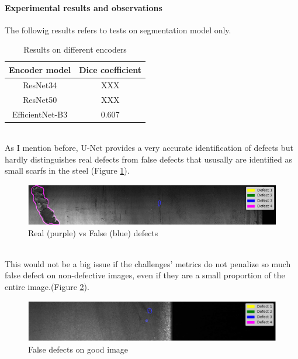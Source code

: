 \documentclass[10pt,twocolumn,letterpaper]{article}
\begin{document}
      \paragraph{Experimental results and observations}
         The followig results refers to tests on segmentation model only.
         \begin{table}[h]
            \centering
            \begin{tabular}{||c c||} 
            \hline
            Encoder model & Dice coefficient\\ [0.5ex] 
            \hline\hline
            ResNet34 & XXX \\ 
            \hline
            ResNet50 & XXX \\
            \hline
            EfficientNet-B3 & 0.607 \\
            \hline
         \end{tabular}
        \caption{Results on different encoders}
        \label{table:res_encoders}
      \end{table}
         \\As I mention before, U-Net provides a very accurate identification of defects but hardly distinguishes real defects from false defects that ususally are identified as small scarfs in the steel (Figure \ref{fig:result1}). 
         \begin{figure}[h]
            \centering
            \caption{Real (purple) vs False (blue) defects} \label{fig:result1}
            \includegraphics[scale=0.5]{Img_Result1.png}
         \end{figure}
         \\This would not be a big issue if the challenges' metrics do not penalize so much false defect on non-defective images, even if they are a small proportion of the entire image.(Figure \ref{fig:result2}).  
         \begin{figure}[h]
            \centering
            \caption{False defects on good image} \label{fig:result2}
            \includegraphics[scale=0.355]{Img_Result2.png}
         \end{figure}
   
\end{document}
